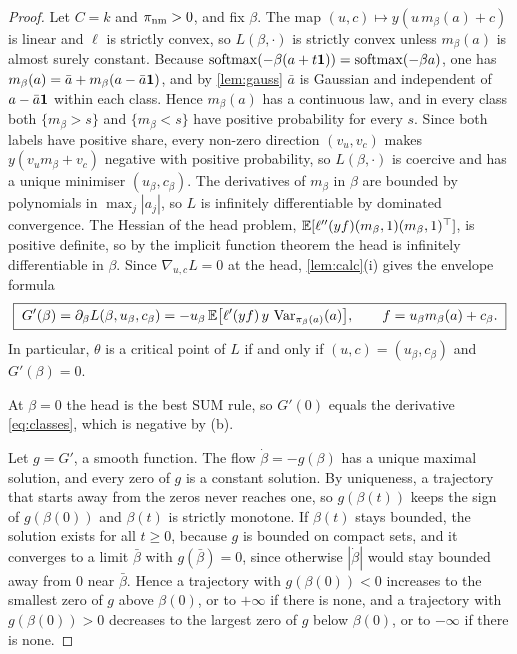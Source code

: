 \begin{proof}
 Let $C=k$ and $\pi_{\mathrm{nm}}>0$, and fix $\beta$. The map $(u,c)\mapsto y(u\,m_\beta(a)+c)$ is linear and $\ell$ is strictly convex, so $L(\beta,\cdot)$ is strictly convex unless $m_\beta(a)$ is almost surely constant. Because $\operatorname{softmax}(-\beta(a+t\mathbf{1}))=\operatorname{softmax}(-\beta a)$, one has $m_\beta(a)=\bar a+m_\beta(a-\bar a\mathbf{1})$, and by \cref{lem:gauss} $\bar a$ is Gaussian and independent of $a-\bar a\mathbf{1}$ within each class. Hence $m_\beta(a)$ has a continuous law, and in every class both $\{m_\beta>s\}$ and $\{m_\beta<s\}$ have positive probability for every $s$. Since both labels have positive share, every non-zero direction $(v_u,v_c)$ makes $y(v_um_\beta+v_c)$ negative with positive probability, so $L(\beta,\cdot)$ is coercive and has a unique minimiser $(u_\beta,c_\beta)$. The derivatives of $m_\beta$ in $\beta$ are bounded by polynomials in $\max_j|a_j|$, so $L$ is infinitely differentiable by dominated convergence. The Hessian of the head problem, $\mathbb{E}[\ell''(yf)(m_\beta,1)(m_\beta,1)^\top]$, is positive definite, so by the implicit function theorem \citep[Thm.~9.28]{rudin1976} the head is infinitely differentiable in $\beta$. Since $\nabla_{u,c}L=0$ at the head, \cref{lem:calc}(i) gives the envelope formula
\begin{equation}\label{eq:envelope}
  \boxed{\;G'(\beta)=\partial_\beta L(\beta,u_\beta,c_\beta)=-u_\beta\,\mathbb{E}\big[\ell'(yf)\,y\,\operatorname{Var}_{\pi_\beta(a)}(a)\big],
  \qquad f=u_\beta m_\beta(a)+c_\beta .\;}
\end{equation}
In particular, $\theta$ is a critical point of $L$ if and only if $(u,c)=(u_\beta,c_\beta)$ and $G'(\beta)=0$.

 At $\beta=0$ the head is the best SUM rule, so $G'(0)$ equals the derivative \cref{eq:classes}, which is negative by (b).

 Let $g=G'$, a smooth function. The flow $\dot\beta=-g(\beta)$ has a unique maximal solution, and every zero of $g$ is a constant solution. By uniqueness, a trajectory that starts away from the zeros never reaches one, so $g(\beta(t))$ keeps the sign of $g(\beta(0))$ and $\beta(t)$ is strictly monotone. If $\beta(t)$ stays bounded, the solution exists for all $t\ge0$, because $g$ is bounded on compact sets, and it converges to a limit $\bar\beta$ with $g(\bar\beta)=0$, since otherwise $|\dot\beta|$ would stay bounded away from $0$ near $\bar\beta$. Hence a trajectory with $g(\beta(0))<0$ increases to the smallest zero of $g$ above $\beta(0)$, or to $+\infty$ if there is none, and a trajectory with $g(\beta(0))>0$ decreases to the largest zero of $g$ below $\beta(0)$, or to $-\infty$ if there is none.


\end{proof}
